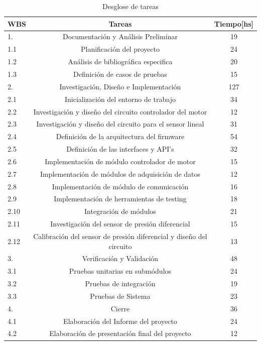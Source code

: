 \begin{table}[h]
	\centering
	\caption[caption corto]{Desglose de tareas}
	\begin{tabular}{l c c}    
		\toprule
		\textbf{WBS}  & \textbf{Tareas} 	 & \textbf{Tiempo[hs]}\\
		\midrule
		1.   & Documentación y Análisis Preliminar	&  19 \\		
		1.1  & Planificación del proyecto			&  24 \\
		1.2  & Análisis de bibliográfica especifica &  20 \\
		1.3  & Definición de casos de pruebas		&  15 \\
		2.   & Investigación, Diseño e Implementación & 127 \\
		2.1  & Inicialización del entorno de trabajo  & 34\\
		2.2  & Investigación y diseño del circuito controlador del motor & 12\\
		2.3 & Investigación y diseño del circuito para el sensor lineal &31\\
		2.4 & Definición de la arquitectura del firmware & 54\\
		2.5 & Definición de las interfaces y API’s  &32\\
		2.6 & Implementación de módulo controlador de motor &15\\
		2.7 & Implementación de módulos de adquisición de datos &12\\
		2.8 & Implementación de módulo de comunicación & 16\\
		2.9 & Implementación de herramientas de testing & 18\\
		2.10 & Integración de módulos & 21\\
		2.11 & Investigación  del sensor de presión diferencial & 15\\
		2.12 & Calibración del sensor de presión diferencial y diseño del circuito &13\\
		3. & Verificación y Validación & 48\\
		3.1 & Pruebas unitarias en submódulos &24\\
		3.2 & Pruebas de integración &19\\
		3.3 & Pruebas de Sistema &23\\
		4. & Cierre & 36\\
		4.1 & Elaboración del Informe del proyecto & 24\\
		4.2 & Elaboración de presentación final del proyecto &12\\
		\bottomrule
		\hline
	\end{tabular}
	\label{tab:seccplanificacion}
\end{table}

